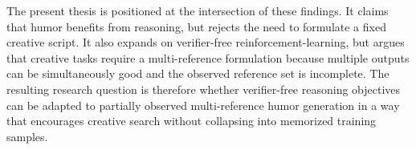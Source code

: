 The present thesis is positioned at the intersection of these findings. It claims that humor benefits from reasoning, but rejects the need to formulate a fixed creative script. It also expands on verifier-free reinforcement-learning, but argues that creative tasks require a multi-reference formulation because multiple outputs can be simultaneously good and the observed reference set is incomplete. The resulting research question is therefore whether verifier-free reasoning objectives can be adapted to partially observed multi-reference humor generation in a way that encourages creative search without collapsing into memorized training samples.